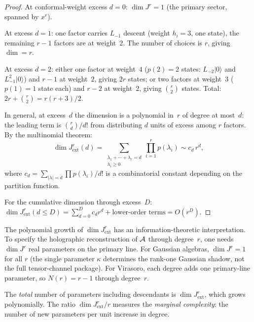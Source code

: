 \begin{proof}
At conformal-weight excess $d = 0$: $\dim J^r = 1$
(the primary sector, spanned by $x^r$).

At excess $d = 1$: one factor carries
$L_{-1}$ descent (weight $h_i = 3$, one state), the
remaining $r - 1$ factors are at weight~$2$. The number
of choices is $r$, giving $\dim = r$.

At excess $d = 2$: either one factor at weight~$4$
($p(2) = 2$ states: $L_{-2}|0\rangle$ and $L_{-1}^2|0\rangle$)
and $r - 1$ at weight~$2$, giving $2r$ states; or
two factors at weight~$3$ ($p(1) = 1$ state each)
and $r - 2$ at weight~$2$, giving $\binom{r}{2}$ states.
Total: $2r + \binom{r}{2} = r(r+3)/2$.

In general, at excess~$d$ the dimension is a polynomial
in~$r$ of degree at most~$d$: the leading term is
$\binom{r}{d}/d!$ from distributing $d$ units of excess
among $r$ factors. By the multinomial theorem:
\begin{equation}%
\dim J^r_{\mathrm{ext}}(d)
= \sum_{\substack{\lambda_1 + \cdots + \lambda_r = d \\
\lambda_i \geq 0}}
\prod_{i=1}^r p(\lambda_i)
\sim c_d\,r^d,
\end{equation}
where $c_d = \sum_{|\lambda| = d} \prod p(\lambda_i) / d!$
is a combinatorial constant depending on the partition
function.

For the cumulative dimension through excess~$D$:
$\dim J^r_{\mathrm{ext}}(d \leq D) = \sum_{d=0}^D
c_d r^d + \text{lower-order terms} = O(r^D)$.
\end{proof}

\begin{remark}
The polynomial growth of $\dim J^r_{\mathrm{ext}}$
has an information-theoretic interpretation. To specify the
holographic reconstruction of $\mathcal{A}$ through degree~$r$,
one needs $\dim J^r$ real parameters on the primary line.
For Gaussian algebras, $\dim J^r = 1$ for all $r$ (the
single parameter $\kappa$ determines the rank-one Gaussian shadow,
not the full tensor-channel package). For
Virasoro, each degree adds one primary-line parameter,
so $N(r) = r - 1$ through degree~$r$.

The \emph{total} number of parameters including descendants
is $\dim J^r_{\mathrm{ext}}$, which grows polynomially.
The ratio $\dim J^r_{\mathrm{ext}} / r$ measures the
\emph{marginal complexity}: the number of new parameters
per unit increase in degree.
\end{remark}

